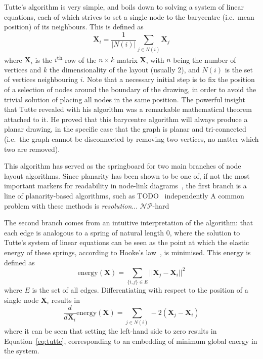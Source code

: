 Tutte's algorithm is very simple, and boils down to solving a system of linear equations, each of which strives to set a single node to the barycentre (i.e.\ mean position) of its neighbours. This is defined as 
\begin{equation}
    \mathbf{X}_i = \frac{1}{|N(i)|}\sum_{j\in N(i)}\mathbf{X}_j
\label{eq:tutte}
\end{equation}
where $\mathbf{X}_i$ is the $i$\textsuperscript{th} row of the $n\times k$ matrix $\mathbf{X}$, with $n$ being the number of vertices and $k$ the dimensionality of the layout (usually $2$), and $N(i)$ is the set of vertices neighbouring $i$.
Note that a necessary initial step is to fix the position of a selection of nodes around the boundary of the drawing, in order to avoid the trivial solution of placing all nodes in the same position.
The powerful insight that Tutte revealed with his algorithm was a remarkable mathematical theorem attached to it. He proved that this barycentre algorithm will always produce a planar drawing, in the specific case that the graph is planar and tri-connected (i.e.\ the graph cannot be disconnected by removing two vertices, no matter which two are removed).

This algorithm has served as the springboard for two main branches of node layout algorithms. Since planarity has been shown to be one of, if not the most important markers for readability in node-link diagrams~\cite{todo}, the first branch is a line of planarity-based algorithms, such as TODO~\cite{deFraysseix-Pach-Pollack} \cite{Chrobak} independently \cite{Schnyder}
A common problem with these methods is \emph{resolution}...
$\mathcal{NP}$-hard

The second branch comes from an intuitive interpretation of the algorithm: that each edge is analogous to a spring of natural length 0, where the solution to Tutte's system of linear equations can be seen as the point at which the elastic energy of these springs, according to Hooke's law~\cite{hooke}, is minimised. This energy is defined as
\begin{equation}
    \mathrm{energy}(\mathbf{X}) = \sum_{\{i,j\}\in E}||\mathbf{X}_j-\mathbf{X}_i||^2
\label{eq:tutte_energy}
\end{equation}
where $E$ is the set of all edges. Differentiating with respect to the position of a single node $\mathbf{X}_i$ results in
\begin{equation}
    \frac{d}{d\mathbf{X}_i}\mathrm{energy}(\mathbf{X}) = \sum_{j\in N(i)}-2(\mathbf{X}_j-\mathbf{X}_i)
\label{eq:tutte_force}
\end{equation}
where it can be seen that setting the left-hand side to zero results in Equation~\eqref{eq:tutte}, corresponding to an embedding of minimum global energy in the system.

